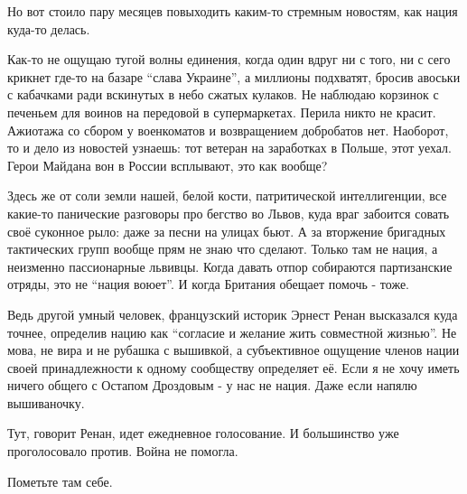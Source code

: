 Но вот стоило пару месяцев повыходить каким-то стремным новостям, как нация
куда-то делась. 

Как-то не ощущаю тугой волны единения, когда один вдруг ни с того, ни с сего
крикнет где-то на базаре \enquote{слава Украине}, а миллионы подхватят, бросив авоськи
с кабачками ради вскинутых в небо сжатых кулаков. Не наблюдаю корзинок с
печеньем для воинов на передовой в супермаркетах. Перила никто не красит.
Ажиотажа со сбором у военкоматов и возвращением добробатов нет. Наоборот, то и
дело из новостей узнаешь: тот ветеран на заработках в Польше, этот уехал. Герои
Майдана вон в России всплывают, это как вообще?

Здесь же от соли земли нашей, белой кости, патритической интеллигенции, все
какие-то панические разговоры про бегство во Львов, куда враг забоится совать
своё суконное рыло: даже за песни на улицах бьют. А за вторжение бригадных
тактических групп вообще прям не знаю что сделают. Только там не нация, а
неизменно пассионарные львивцы. Когда давать отпор собираются партизанские
отряды, это не \enquote{нация воюет}. И когда Британия обещает помочь - тоже. 

Ведь другой умный человек, французский историк Эрнест Ренан высказался куда
точнее, определив нацию как \enquote{согласие и желание жить совместной жизнью}. Не
мова, не вира и не рубашка с вышивкой, а субъективное ощущение членов нации
своей принадлежности к одному сообществу определяет её. Если я не хочу иметь
ничего общего с Остапом Дроздовым - у нас не нация. Даже если напялю
вышиваночку. 

Тут, говорит Ренан, идет ежедневное голосование. И большинство уже
проголосовало против. Война не помогла.

Пометьте там себе.
